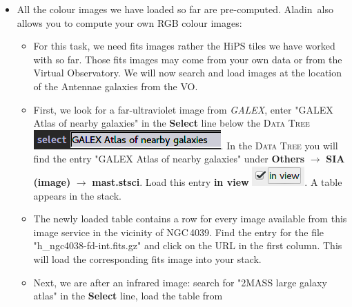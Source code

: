 \documentclass [a4paper, 12pt]{article}
\newcommand{\aladin}{{\textsc{A}{ladin}}}
\begin{document}
\begin{itemize}
    \item All the colour images we have loaded so far are pre-computed.
\aladin\ also allows you to compute your own RGB colour images:
     \begin{itemize}
         \item For this task, we need fits images rather the HiPS tiles we have 
         worked with so far. Those fits images may come from your own data or 
         from the Virtual Observatory. We will now search and load images at 
         the location of the Antennae galaxies from the VO. 
         \item First, we look for a far-ultraviolet image from 
         \textit{GALEX}, enter "GALEX Atlas of nearby galaxies" in the 
         \textbf{Select} line below the 
         \textsc{Data Tree} \includegraphics[width=0.17  
         \textwidth]{../images/aladin_select_GALEX.png}. In the \textsc{Data 
         Tree} you will find the entry "GALEX Atlas of nearby galaxies" under 
         \textbf{Others} $\rightarrow$ \textbf{SIA (image)} $\rightarrow$ 
         \textbf{mast.stsci}. Load this entry \textbf{in view} 
         \includegraphics[width=0.07 
         \textwidth]{../images/aladin_load_inview.png}. A table appears in the 
         stack. 
         \item The newly loaded table contains a row for every image available 
         from this image service in the vicinity of NGC\,4039. Find the entry 
         for the file "h\_ngc4038-fd-int.fits.gz" and click on the URL in the 
         first column. This will load the corresponding fits image into your 
         stack. 
         \item Next, we are after an infrared image: search for "2MASS large 
         galaxy atlas" in the \textbf{Select} line, load the table from 

\end{itemize}
\end{itemize}
\end{document}
